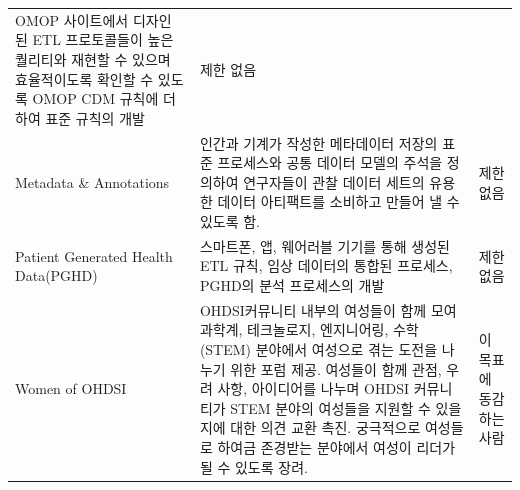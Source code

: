 \documentclass[11pt]{book}
\theoremstyle{definition}
\theoremstyle{definition}
\theoremstyle{definition}
\theoremstyle{remark}
\begin{document}
\begin{longtable}[]{@{}lll@{}}
\begin{minipage}[t]{0.30\columnwidth}
OMOP 사이트에서 디자인 된 ETL 프로토콜들이 높은 퀄리티와 재현할 수
있으며 효율적이도록 확인할 수 있도록 OMOP CDM 규칙에 더하여 표준 규칙의
개발\strut
\end{minipage} & \begin{minipage}[t]{0.15\columnwidth}\raggedright\strut
제한 없음\strut
\end{minipage}\tabularnewline
\begin{minipage}[t]{0.11\columnwidth}\raggedright\strut
Metadata \& Annotations\strut
\end{minipage} & \begin{minipage}[t]{0.30\columnwidth}\raggedright\strut
인간과 기계가 작성한 메타데이터 저장의 표준 프로세스와 공통 데이터
모델의 주석을 정의하여 연구자들이 관찰 데이터 세트의 유용한 데이터
아티팩트를 소비하고 만들어 낼 수 있도록 함.\strut
\end{minipage} & \begin{minipage}[t]{0.15\columnwidth}\raggedright\strut
제한 없음\strut
\end{minipage}\tabularnewline
\begin{minipage}[t]{0.11\columnwidth}\raggedright\strut
Patient Generated Health Data(PGHD)\strut
\end{minipage} & \begin{minipage}[t]{0.30\columnwidth}\raggedright\strut
스마트폰, 앱, 웨어러블 기기를 통해 생성된 ETL 규칙, 임상 데이터의 통합된
프로세스, PGHD의 분석 프로세스의 개발\strut
\end{minipage} & \begin{minipage}[t]{0.15\columnwidth}\raggedright\strut
제한 없음\strut
\end{minipage}\tabularnewline
\begin{minipage}[t]{0.11\columnwidth}\raggedright\strut
Women of OHDSI\strut
\end{minipage} & \begin{minipage}[t]{0.30\columnwidth}\raggedright\strut
OHDSI커뮤니티 내부의 여성들이 함께 모여 과학계, 테크놀로지, 엔지니어링,
수학(STEM) 분야에서 여성으로 겪는 도전을 나누기 위한 포럼 제공. 여성들이
함께 관점, 우려 사항, 아이디어를 나누며 OHDSI 커뮤니티가 STEM 분야의
여성들을 지원할 수 있을지에 대한 의견 교환 촉진. 궁극적으로 여성들로
하여금 존경받는 분야에서 여성이 리더가 될 수 있도록 장려.\strut
\end{minipage} & \begin{minipage}[t]{0.15\columnwidth}\raggedright\strut
이 목표에 동감하는 사람\strut
\end{minipage}\tabularnewline

\end{longtable}
\end{document}
